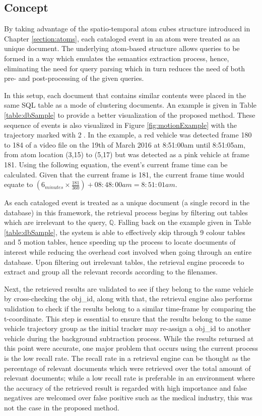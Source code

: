 \subsection{Concept}
\label{versionOneConcept}
By taking advantage of the spatio-temporal atom cubes structure introduced in Chapter \ref{section:atoms}, each cataloged event in an atom were treated as an unique document. The underlying atom-based structure allows queries to be formed in a way which emulates the semantics extraction process, hence, eliminating the need for query parsing which in turn reduces the need of both pre- and post-processing of the given queries. 

In this setup, each document that contains similar contents were placed in the same SQL table as a mode of clustering documents. An example is given in Table \ref{table:dbSample} to provide a better visualization of the proposed method. These sequence of events is also visualized in Figure \ref{fig:motionExample} with the trajectory marked with \textcircled{2}. In the example, a red vehicle was detected frame 180 to 184 of a video file on the 19th of March 2016 at 8:51:00am until 8:51:05am, from atom location (3,15) to (5,17) but was detected as a pink vehicle at frame 181. Using the following equation, the event's current frame time can be calculated. Given that the current frame is 181, the current frame time would equate to  $(6_{minutes} \times \frac{181}{360}) + 08:48:00am = 8:51:01am$.

As each cataloged event is treated as a unique document (a single record in the database) in this framework, the retrieval process begins by filtering out tables which are irrelevant to the query, $\mathbb{Q}$. Falling back on the example given in Table \ref{table:dbSample}, the system is able to effectively skip through 9 colour tables and 5 motion tables, hence speeding up the process to locate documents of interest while reducing the overhead cost involved when going through an entire database. Upon filtering out irrelevant tables, the retrieval engine proceeds to extract and group all the relevant records according to the filenames.

Next, the retrieved results are validated to see if they belong to the same vehicle by cross-checking the obj\_id, along with that, the retrieval engine also performs validation to check if the results belong to a similar time-frame by comparing the t-coordinate. This step is essential to ensure that the results belong to the same vehicle trajectory group as the initial tracker may re-assign a obj\_id to another vehicle during the background subtraction process. While the results returned at this point were accurate, one major problem that occurs using the current process is the low recall rate. The recall rate in a retrieval engine can be thought as the percentage of relevant documents which were retrieved over the total amount of relevant documents; while a low recall rate is preferable in an environment where the accuracy of the retrieved result is regarded with high importance and false negatives are welcomed over false positive such as the medical industry, this was not the case in the proposed method.


